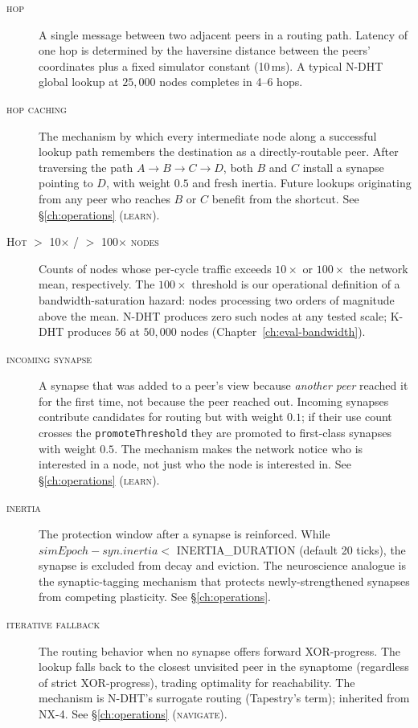 \documentclass[twoside,nobib]{tufte-book}
\newcommand{\NDHT}{N-DHT\xspace}
\newcommand{\KDHT}{K-DHT\xspace}
\begin{document}
\begin{description}
\item[\textsc{hop}]
A single message between two adjacent peers in a routing path.
Latency of one hop is determined by the haversine distance between
the peers' coordinates plus a fixed simulator constant (10\,ms). A
typical \NDHT global lookup at $25{,}000$ nodes completes in 4--6
hops.

\item[\textsc{hop caching}]
The mechanism by which every intermediate node along a successful
lookup path remembers the destination as a directly-routable
peer. After traversing the path $A \to B \to C \to D$, both $B$
and $C$ install a synapse pointing to $D$, with weight $0.5$ and
fresh inertia. Future lookups originating from any peer who reaches
$B$ or $C$ benefit from the shortcut. See \S\ref{ch:operations}
(\textsc{learn}).

\item[\textsc{Hot $>$ 10$\times$ / $>$ 100$\times$ nodes}]
Counts of nodes whose per-cycle traffic exceeds $10\times$ or
$100\times$ the network mean, respectively. The $100\times$
threshold is our operational definition of a bandwidth-saturation
hazard: nodes processing two orders of magnitude above the mean.
\NDHT produces zero such nodes at any tested scale; \KDHT produces
$56$ at $50{,}000$ nodes (Chapter~\ref{ch:eval-bandwidth}).

\item[\textsc{incoming synapse}]
A synapse that was added to a peer's view because \emph{another
peer} reached it for the first time, not because the peer reached
out. Incoming synapses contribute candidates for routing but with
weight $0.1$; if their use count crosses the
\texttt{promoteThreshold} they are promoted to first-class
synapses with weight $0.5$. The mechanism makes the network notice
who is interested in a node, not just who the node is interested
in. See \S\ref{ch:operations} (\textsc{learn}).

\item[\textsc{inertia}]
The protection window after a synapse is reinforced. While
$\mathit{simEpoch} - \mathit{syn.inertia} <$ \textsc{INERTIA\_DURATION}
(default 20 ticks), the synapse is excluded from decay and
eviction. The neuroscience analogue is the synaptic-tagging
mechanism
that protects newly-strengthened synapses from competing
plasticity. See \S\ref{ch:operations}.

\item[\textsc{iterative fallback}]
The routing behavior when no synapse offers forward XOR-progress.
The lookup falls back to the closest unvisited peer in the
synaptome (regardless of strict XOR-progress), trading
optimality for reachability. The mechanism is \NDHT's surrogate
routing (Tapestry's term); inherited from NX-4. See
\S\ref{ch:operations} (\textsc{navigate}).


\end{description}
\end{document}
